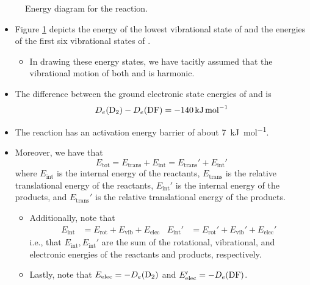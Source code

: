 \documentclass[../notes.tex]{subfiles}
\begin{document}
\begin{itemize}
\begin{figure}[h!]
        \caption{Energy diagram for the  reaction.}
        \label{fig:FD2}
    \end{figure}
    \begin{itemize}
        \item Figure \ref{fig:FD2} depicts the energy of the lowest vibrational state of  and the energies of the first six vibrational states of .
        \begin{itemize}
            \item In drawing these energy states, we have tacitly assumed that the vibrational motion of both  and  is harmonic.
        \end{itemize}
        \item The difference between the ground electronic state energies of  and  is
        \begin{equation*}
            D_e(\ce{D2})-D_e(\ce{DF}) = -\SI{140}{\kilo\joule\per\mole}
        \end{equation*}
        \item The reaction has an activation energy barrier of about \SI{7}{\kilo\joule\per\mole}.
        \item Moreover, we have that
        \begin{equation*}
            E_\text{tot} = E_\text{trans}+E_\text{int}
            = E_\text{trans}'+E_\text{int}'
        \end{equation*}
        where $E_\text{int}$ is the internal energy of the reactants, $E_\text{trans}$ is the relative translational energy of the reactants, $E_\text{int}'$ is the internal energy of the products, and $E_\text{trans}'$ is the relative translational energy of the products.
        \begin{itemize}
            \item Additionally, note that
            \begin{align*}
                E_\text{int} &= E_\text{rot}+E_\text{vib}+E_\text{elec}&
                E_\text{int}' &= E_\text{rot}'+E_\text{vib}'+E_\text{elec}'
            \end{align*}
            i.e., that $E_\text{int},E_\text{int}'$ are the sum of the rotational, vibrational, and electronic energies of the reactants and products, respectively.
            \item Lastly, note that $E_\text{elec}=-D_e(\ce{D2})$ and $E_\text{elec}'=-D_e(\ce{DF})$.
        \end{itemize}
    \end{itemize}
\end{itemize}
\end{document}
